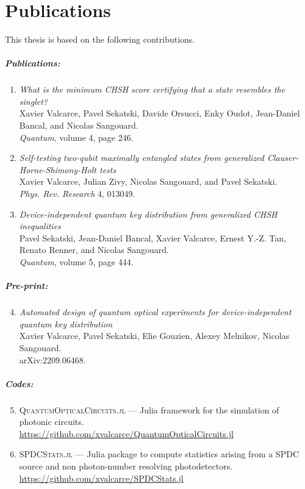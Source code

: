 \chapter{Publications}

This thesis is based on the following contributions.

\paragraph{Publications:}
\begin{enumerate}
	\item 
		\textit{What is the minimum CHSH score certifying that a state resembles the singlet?} \\
		Xavier Valcarce, Pavel Sekatski, Davide Orsucci, Enky Oudot, Jean-Daniel Bancal, and Nicolas Sangouard. \\
		\textit{Quantum}, volume 4, page 246.
	\item 
		\textit{Self-testing two-qubit maximally entangled states from generalized Clauser-Horne-Shimony-Holt tests} \\
		Xavier Valcarce, Julian Zivy, Nicolas Sangouard, and Pavel Sekatski. \\
		\textit{Phys. Rev. Research} 4, 013049.
	\item
		\textit{Device-independent quantum key distribution from generalized CHSH inequalities} \\
		Pavel Sekatski, Jean-Daniel Bancal, Xavier Valcarce, Ernest Y.-Z. Tan, Renato Renner, and Nicolas Sangouard. \\
		\textit{Quantum}, volume 5, page 444.
\end{enumerate}

\paragraph{Pre-print:}
\begin{enumerate}
	\setcounter{enumi}{3}
	\item 
		\textit{Automated design of quantum optical experiments for device-independent quantum key distribution}  \\
		Xavier Valcarce, Pavel Sekatski, Elie Gouzien, Alexey Melnikov, Nicolas Sangouard. \\
		arXiv:2209.06468.
\end{enumerate}


\paragraph{Codes:}
\begin{enumerate}
	\setcounter{enumi}{4}
	\item \textsc{QuantumOpticalCircuits.jl} --- Julia framework for the simulation of photonic circuits. \\
		\url{https://github.com/xvalcarce/QuantumOpticalCircuits.jl}
	\item \textsc{SPDCStats.jl} --- Julia package to compute statistics arising from a SPDC source and non photon-number resolving photodetectors. \\
		\url{https://github.com/xvalcarce/SPDCStats.jl}
\end{enumerate}
